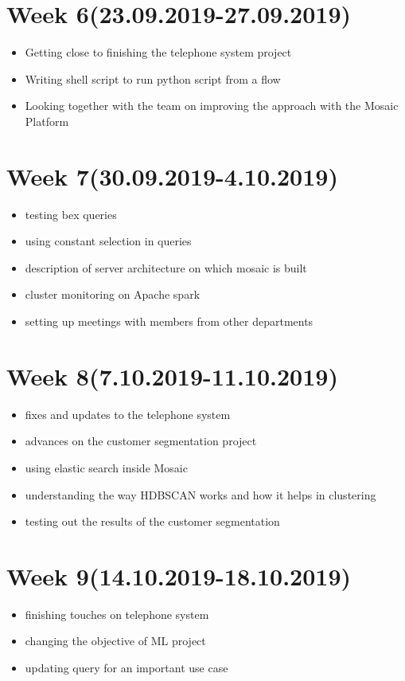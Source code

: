 \documentclass{article}
\begin{document}
	\section{Week 6(23.09.2019-27.09.2019)}
	\begin{itemize}
		\item Getting close to finishing the telephone system project
		\item Writing shell script to run python script from a flow
		\item Looking together with the team on improving the approach with the Mosaic Platform
	\end{itemize}

	\section{Week 7(30.09.2019-4.10.2019)}
	\begin{itemize}
		\item testing bex queries
		\item using constant selection in queries
		\item description of server architecture on which mosaic is built
		\item cluster monitoring on Apache spark
		\item setting up meetings with members from other departments
	\end{itemize}

	\section{Week 8(7.10.2019-11.10.2019)}
	\begin{itemize}
		\item fixes and updates to the telephone system
		\item advances on the customer segmentation project
		\item using elastic search inside Mosaic
		\item understanding the way HDBSCAN works and how it helps in clustering
		\item testing out the results of the customer segmentation
	\end{itemize}

	\section{Week 9(14.10.2019-18.10.2019)}
	\begin{itemize}
		\item finishing touches on telephone system
		\item changing the objective of ML project
		\item updating query for an important use case
	\end{itemize}
\end{document}

